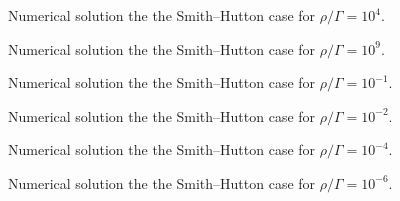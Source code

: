 \begin{figure}[ht]
	\centering
	
	\caption{Numerical solution the the Smith--Hutton case for $\rho / \Gamma = 10^4$.}
	\label{fig:smith_hutton_N201_Pe1.0e+04}
\end{figure}

\begin{figure}[ht]
	\centering
	
	\caption{Numerical solution the the Smith--Hutton case for $\rho / \Gamma = 10^9$.}
	\label{fig:smith_hutton_N201_Pe1.0e+09}
\end{figure}

\begin{figure}[ht]
	\centering
	
	\caption{Numerical solution the the Smith--Hutton case for $\rho / \Gamma = 10^{-1}$.}
	\label{fig:smith_hutton_N201_Pe1.0e-01}
\end{figure}

\begin{figure}[ht]
	\centering
	
	\caption{Numerical solution the the Smith--Hutton case for $\rho / \Gamma = 10^{-2}$.}
	\label{fig:smith_hutton_N201_Pe1.0e-02}
\end{figure}

\begin{figure}[ht]
	\centering
	
	\caption{Numerical solution the the Smith--Hutton case for $\rho / \Gamma = 10^{-4}$.}
	\label{fig:smith_hutton_N201_Pe1.0e-04}
\end{figure}

\begin{figure}[ht]
	\centering
	
	\caption{Numerical solution the the Smith--Hutton case for $\rho / \Gamma = 10^{-6}$.}
	\label{fig:smith_hutton_N201_Pe1.0e-06}
\end{figure}




